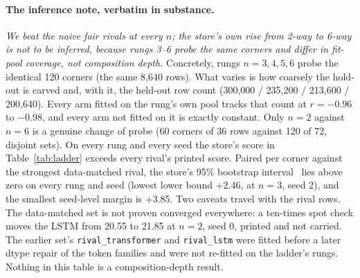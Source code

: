\documentclass{article} %
\begin{document}
\paragraph{The inference note, verbatim in substance.} \emph{We beat the naive fair rivals at
every $n$; the store's own rise from 2-way to 6-way is not to be inferred, because rungs 3--6
probe the same corners and differ in fit-pool coverage, not composition depth.} Concretely,
rungs $n=3,4,5,6$ probe the identical 120 corners (the same 8,640 rows). What varies is how
coarsely the hold-out is carved and, with it, the held-out row count (300,000 / 235,200 /
213,600 / 200,640). Every arm fitted on the rung's own pool tracks that count at
$r=-0.96$ to $-0.98$, and every arm not fitted on it is exactly constant.
Only $n=2$ against $n=6$ is a genuine change of probe (60 corners of 36 rows against 120 of
72, disjoint sets). %
On every rung and every seed the store's score in Table~\ref{tab:ladder} exceeds every rival's
printed score. Paired per corner against the strongest data-matched rival, the store's 95\% %
bootstrap interval~\citep{efron1979bootstrap} lies above zero on every rung and seed (lowest lower
bound +2.46, at $n=3$, seed 2), and the smallest seed-level margin is +3.85. Two caveats travel with %
the rival rows. The data-matched set is not proven converged everywhere: a ten-times spot check %
moves the LSTM from 20.55 to 21.85 at $n=2$, seed 0, printed and not carried. The earlier set's %
\texttt{rival\_transformer} and \texttt{rival\_lstm} were fitted before a later dtype repair of the
token families and were not re-fitted on the ladder's rungs. Nothing in this table is a
composition-depth result.
\end{document}
